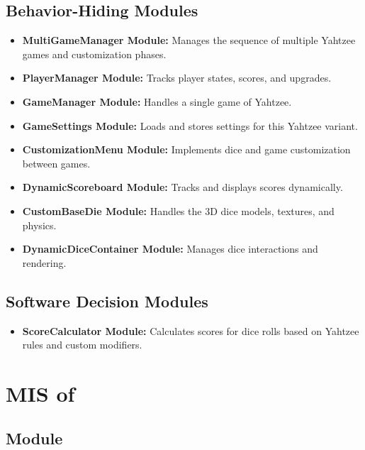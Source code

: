 \documentclass[12pt, titlepage]{article}
\begin{document}
\subsection{Behavior-Hiding Modules}
\begin{itemize}
    \item \textbf{MultiGameManager Module:} Manages the sequence of multiple Yahtzee games and customization phases.
    \item \textbf{PlayerManager Module:} Tracks player states, scores, and upgrades.
    \item \textbf{GameManager Module:} Handles a single game of Yahtzee.
    \item \textbf{GameSettings Module:} Loads and stores settings for this Yahtzee variant.
    \item \textbf{CustomizationMenu Module:} Implements dice and game customization between games.
    \item \textbf{DynamicScoreboard Module:} Tracks and displays scores dynamically.
    \item \textbf{CustomBaseDie Module:} Handles the 3D dice models, textures, and physics.
    \item \textbf{DynamicDiceContainer Module:} Manages dice interactions and rendering.
\end{itemize}

\subsection{Software Decision Modules}
\begin{itemize}
    \item \textbf{ScoreCalculator Module:} Calculates scores for dice rolls based on Yahtzee rules and custom modifiers.
\end{itemize}

\newpage

\iffalse
\section{MIS of } \label{Module} 



\subsection{Module}
\end{document}
